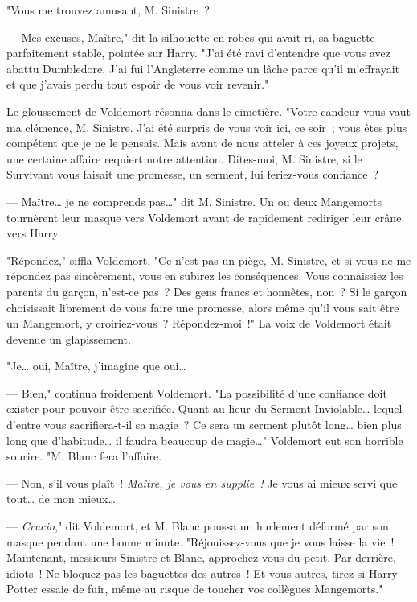 "Vous me trouvez amusant, M. Sinistre~?

--- Mes excuses, Maître," dit la silhouette en robes qui avait ri, sa baguette parfaitement stable, pointée sur Harry. "J'ai été ravi d'entendre que vous avez abattu Dumbledore. J'ai fui l'Angleterre comme un lâche parce qu'il m'effrayait et que j'avais perdu tout espoir de vous voir revenir."

Le gloussement de Voldemort résonna dans le cimetière. "Votre candeur vous vaut ma clémence, M. Sinistre. J'ai été surpris de vous voir ici, ce soir~; vous êtes plus compétent que je ne le pensais. Mais avant de nous atteler à ces joyeux projets, une certaine affaire requiert notre attention. Dites-moi, M. Sinistre, si le Survivant vous faisait une promesse, un serment, lui feriez-vous confiance~?

--- Maître… je ne comprends pas…" dit M. Sinistre. Un ou deux Mangemorts tournèrent leur masque vers Voldemort avant de rapidement rediriger leur crâne vers Harry.

"Répondez," siffla Voldemort. "Ce n'est pas un piège, M. Sinistre, et si vous ne me répondez pas sincèrement, vous en subirez les conséquences. Vous connaissiez les parents du garçon, n'est-ce pas~? Des gens francs et honnêtes, non~? Si le garçon choisissait librement de vous faire une promesse, alors même qu'il vous sait être un Mangemort, y croiriez-vous~? Répondez-moi~!" La voix de Voldemort était devenue un glapissement.

"Je… oui, Maître, j'imagine que oui…

--- Bien," continua froidement Voldemort. "La possibilité d'une confiance doit exister pour pouvoir être sacrifiée. Quant au lieur du Serment Inviolable… lequel d'entre vous sacrifiera-t-il sa magie~? Ce sera un serment plutôt long… bien plus long que d'habitude… il faudra beaucoup de magie…" Voldemort eut son horrible sourire. "M. Blanc fera l'affaire.

--- Non, s'il vous plaît~! \emph{Maître, je vous en supplie~!} Je vous ai mieux servi que tout… de mon mieux…

--- \emph{Crucio}," dit Voldemort, et M. Blanc poussa un hurlement déformé par son masque pendant une bonne minute. "Réjouissez-vous que je vous laisse la vie~! Maintenant, messieurs Sinistre et Blanc, approchez-vous du petit. Par derrière, idiots~! Ne bloquez pas les baguettes des autres~! Et vous autres, tirez si Harry Potter essaie de fuir, même au risque de toucher vos collègues Mangemorts."

